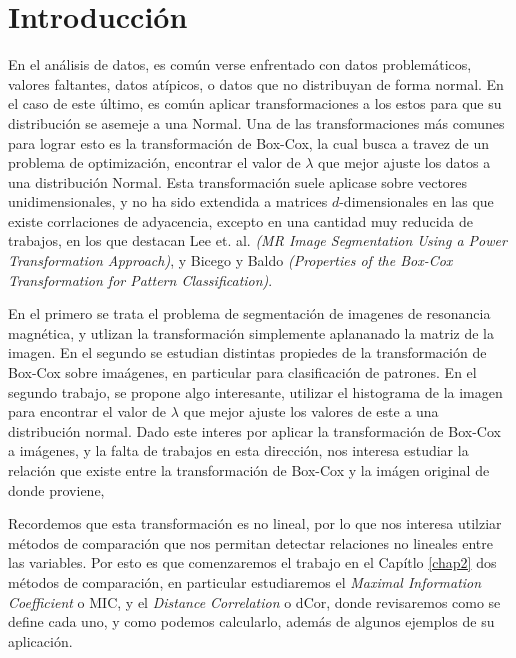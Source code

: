 \chapter{Introducci\'on}\label{chap1}

En el an\'alisis de datos, es com\'un verse enfrentado con datos problem\'aticos, valores faltantes, datos at\'ipicos, o datos que no distribuyan de forma normal. En el caso de este \'ultimo, es com\'un aplicar transformaciones a los estos para que su distribuci\'on se asemeje a una Normal. Una de las transformaciones m\'as comunes para lograr esto es la transformaci\'on de Box-Cox, la cual busca a travez de un problema de optimizaci\'on, encontrar el valor de $\lambda$ que mejor ajuste los datos a una distribuci\'on Normal. Esta transformaci\'on suele aplicase sobre  vectores unidimensionales, y no ha sido extendida a matrices $d$-dimensionales en las que existe corrlaciones de adyacencia, excepto en una cantidad muy reducida de trabajos, en los que destacan Lee et. al. \textit{(MR Image Segmentation Using a Power Transformation Approach)}\cite{lee2009mr}, y Bicego y Baldo \textit{(Properties of the Box-Cox Transformation for Pattern Classification)}\cite{bicego2016}. 

En el primero se trata el problema de segmentaci\'on de imagenes de resonancia magn\'etica, y utlizan la transformaci\'on simplemente aplananado la matriz de la imagen. En el segundo se estudian distintas propiedes de la transformaci\'on de Box-Cox sobre ima\'agenes, en particular para clasificaci\'on de patrones. En el segundo trabajo, se propone algo interesante, utilizar el histograma de la imagen para encontrar el valor de $\lambda$ que mejor ajuste los valores de este a una distribuci\'on normal. Dado este interes por aplicar la transformaci\'on de Box-Cox a im\'agenes, y la falta de trabajos en esta direcci\'on, nos interesa estudiar la relaci\'on que existe entre la transformaci\'on de Box-Cox y la im\'agen original de donde proviene,

Recordemos que esta transformaci\'on es no lineal, por lo que nos interesa utilziar m\'etodos de comparaci\'on que nos permitan detectar relaciones no lineales entre las variables. Por esto es que comenzaremos el trabajo en el Cap\'itlo \ref{chap2} dos m\'etodos de comparaci\'on, en particular estudiaremos el \textit{Maximal Information Coefficient} o MIC, y el \textit{Distance Correlation} o dCor, donde revisaremos como se define cada uno, y como podemos calcularlo, adem\'as de algunos ejemplos de su aplicaci\'on.

